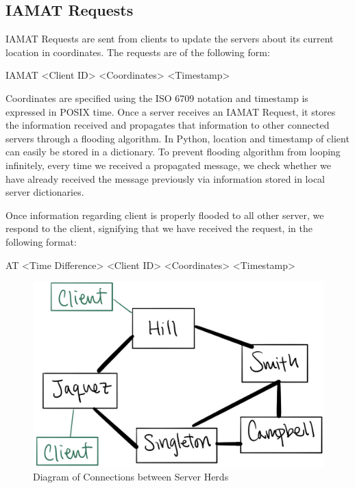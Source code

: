 \subsection{IAMAT Requests}
IAMAT Requests are sent from clients to update the servers about its current location in coordinates. The requests are of the following form:
\begin{center}
    IAMAT <Client ID> <Coordinates> <Timestamp>
\end{center}
Coordinates are specified using the ISO 6709 notation and timestamp is expressed in POSIX time. Once a server receives an IAMAT Request, it stores the information received and propagates that information to other connected servers through a flooding algorithm. In Python, location and timestamp of client can easily be stored in a dictionary. To prevent flooding algorithm from looping infinitely, every time we received a propagated message, we check whether we have already received the message previously via information stored in local server dictionaries. \par
Once information regarding client is properly flooded to all other server, we respond to the client, signifying that we have received the request, in the following format:
\begin{center}
    AT <Time Difference> <Client ID> <Coordinates> <Timestamp>
\end{center}
\begin{figure}
\includegraphics[scale=0.23]{server_connections.jpeg}
\caption{\label{fig:vectors} Diagram of Connections between Server Herds}
\end{figure}
